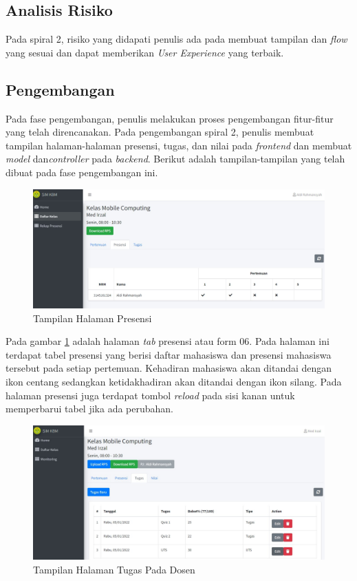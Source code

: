 \subsection{Analisis Risiko}
	Pada spiral 2, risiko yang didapati penulis ada pada membuat tampilan dan \textit{flow} yang sesuai dan dapat memberikan \textit{User Experience} yang terbaik.
\subsection{Pengembangan}
	Pada fase pengembangan, penulis melakukan proses pengembangan fitur-fitur yang telah direncanakan. Pada pengembangan spiral 2, penulis membuat tampilan halaman-halaman presensi, tugas, dan nilai pada \textit{frontend} dan membuat \textit{model} dan\textit{controller} pada \textit{backend}. Berikut adalah tampilan-tampilan yang telah dibuat pada fase pengembangan ini.

\begin{figure}[h!]
	\centering
	\includegraphics[width=1\textwidth]{gambar/ss/presensi}
	\caption{Tampilan Halaman Presensi}
	\label{fig:sspresensi}
\end{figure}

Pada gambar \ref{fig:sspresensi} adalah halaman \textit{tab} presensi atau form 06. Pada halaman ini terdapat tabel presensi yang berisi daftar mahasiswa dan presensi mahasiswa tersebut pada setiap pertemuan. Kehadiran mahasiswa akan ditandai dengan ikon centang sedangkan ketidakhadiran akan ditandai dengan ikon silang. Pada halaman presensi juga terdapat tombol \textit{reload} pada sisi kanan untuk memperbarui tabel jika ada perubahan.

\begin{figure}[h!]
	\centering
	\includegraphics[width=1\textwidth]{gambar/ss/tugas}
	\caption{Tampilan Halaman Tugas Pada Dosen}
	\label{fig:sstugas}
\end{figure}

